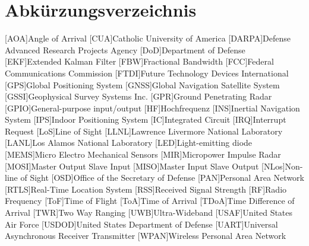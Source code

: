 %
%


\chapter*{Abkürzungsverzeichnis}
\begin{acronym}		
	[AOA]{Angle of Arrival}
	[CUA]{Catholic University of America}
	[DARPA]{Defense Advanced Research Projects Agency}
	[DoD]{Department of Defense}
	[EKF]{Extended Kalman Filter}
	[FBW]{Fractional Bandwidth}
	[FCC]{Federal Communications Commission}
	[FTDI]{Future Technology Devices International}
	[GPS]{Global Positioning System}
	[GNSS]{Global Navigation Satellite System}
	[GSSI]{Geophysical Survey Systems Inc.}
	[GPR]{Ground Penetrating Radar}
	[GPIO]{General-purpose input/output}	%
	[HF]{Hochfrequenz}
	[INS]{Inertial Navigation System}
	[IPS]{Indoor Positioning System}
	[IC]{Integrated Circuit}	%
	[IRQ]{Interrupt Request}
	[LoS]{Line of Sight}
	[LLNL]{Lawrence Livermore National Laboratory}
	[LANL]{Los Alamos National Laboratory}
	[LED]{Light-emitting diode} %
	[MEMS]{Micro Electro Mechanical Sensors}
	[MIR]{Micropower Impulse Radar}
	[MOSI]{Master Output Slave Input}
	[MISO]{Master Input Slave Output}
	[NLos]{Non-line of Sight}
	[OSD]{Office of the Secretary of Defense}
	[PAN]{Personal Area Network}
	[RTLS]{Real-Time Location System}
	[RSS]{Received Signal Strength}
	[RF]{Radio Frequency}
	[ToF]{Time of Flight}
	[ToA]{Time of Arrival}
	[TDoA]{Time Difference of Arrival}
	[TWR]{Two Way Ranging}
	[UWB]{Ultra-Wideband} %
	[USAF]{United States Air Force}
	[USDOD]{United States Department of Defense} %
	[UART]{Universal Asynchronous Receiver Transmitter}
	[WPAN]{Wireless Personal Area Network}

\end{acronym}